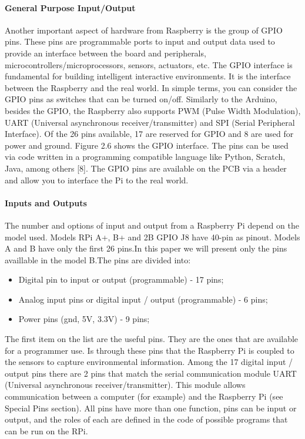 \documentclass{acm_proc_article-sp}
\begin{document}
\paragraph{General Purpose Input/Output}
Another important aspect of hardware from Raspberry is the group of GPIO pins. These pins are programmable ports to input and output data used to provide an interface between the board and peripherals, microcontrollers/microprocessors, sensors, actuators, etc. The GPIO interface is fundamental for building intelligent interactive environments. It is the interface between the Raspberry and the real world. In simple terms, you can consider the GPIO pins as switches that can be turned on/off.
\newline
\newline
Similarly to the Arduino, besides the GPIO, the Raspberry also supports PWM (Pulse Width Modulation), UART (Universal asynchronous receiver/transmitter) and SPI (Serial Peripheral Interface). Of the 26 pins available, 17 are reserved for GPIO and 8 are used for power and ground. Figure 2.6 shows the GPIO interface. The pins can be used via code written in a programming compatible language like Python, Scratch, Java, among others [8].
The GPIO pins are available on the PCB via a header and allow you to interface the Pi to the real world.

\paragraph{Inputs and Outputs}
The number and options of input and output from a Raspberry Pi depend on the model used. Models RPi A+, B+ and 2B GPIO J8 have 40-pin as pinout. Models A and B have only the first 26 pins.In this paper we will present only the pins availlable in the model B.The pins are divided into:

\begin{itemize}
\item Digital pin to input or output (programmable) - 17 pins;	
\item Analog input pins or digital input / output (programmable) - 6 pins;
\item Power pins (gnd, 5V, 3.3V) - 9 pins;
\end{itemize}

The first item on the list are the useful pins. They are the ones that are available for a programmer use. Is through these pins that the Raspberry Pi is coupled to the sensors to capture environmental information. Among the 17 digital input / output pins there are 2 pins that match the serial communication module UART (Universal asynchronous receiver/transmitter). This module allows communication between a computer (for example) and the Raspberry Pi (see Special Pins section). All pins have more than one function, pins can be input or output, and the roles of each are defined in the code of possible programs that can be run on the RPi.
\end{document}

